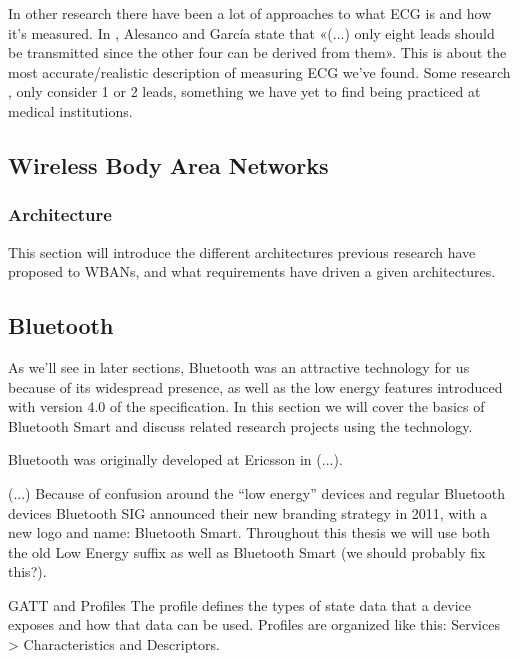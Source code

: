 In other research there have been a lot of approaches to what ECG is and how it's measured. In \cite{Alesanco:2010kc}, Alesanco and García state that «(...) only eight leads should be transmitted since the other four can be derived from them». This is about the most accurate/realistic description of measuring ECG we've found. Some research \cite{yubin:2012tr}, only consider 1 or 2 leads, something we have yet to find being practiced at medical institutions.


\subsection{Wireless Body Area Networks} %
\label{sub:wireless_body_area_networks}

\subsubsection{Architecture} %
\label{ssub:architecture}

This section will introduce the different architectures previous research have proposed to WBANs, and what requirements have driven a given architectures. 



\subsection{Bluetooth} %
\label{sub:bluetooth}

As we'll see in later sections, Bluetooth was an attractive technology for us because of its widespread presence, as well as the low energy features introduced with version 4.0 of the specification. In this section we will cover the basics of Bluetooth Smart and discuss related research projects using the technology.

Bluetooth was originally developed at Ericsson in (...). 

(...) Because of confusion around the ``low energy'' devices and regular Bluetooth devices Bluetooth SIG announced their new branding strategy in 2011, with a new logo and name: Bluetooth Smart. Throughout this thesis we will use both the old Low Energy suffix as well as Bluetooth Smart (we should probably fix this?).

GATT and Profiles
The profile defines the types of state data that a device exposes and how that data can be used. Profiles are organized like this: 
Services > Characteristics and Descriptors.

